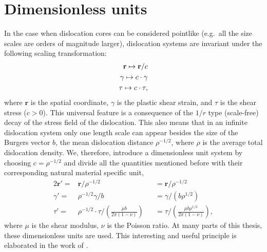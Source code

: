 \chapter{Dimensionless units}\label{sec:dimensionless_units}
In the case when dislocation cores can be considered pointlike (e.g.\ all the size scales are orders of magnitude larger), dislocation systems are invariant under the following scaling transformation:
\begin{align}
  {\mathbf{r}} \mapsto {\mathbf{r}}/c \hfill \\
  \gamma  \mapsto c \cdot \gamma  \hfill \\
  \tau  \mapsto c \cdot \tau,  \hfill \\ 
\end{align}
where $\mathbf{r}$ is the spatial coordinate, $\gamma$ is the plastic shear strain, and $\tau$ is the shear stress ($c>0$). This universal feature is a consequence of the $1/r$ type (scale-free) decay of the stress field of the dislocation. This also means that in an infinite dislocation system only one length scale can appear besides the size of the Burgers vector $b$, the mean dislocation distance $\rho^{-1/2}$, where $\rho$ is the average total dislocation density. We, therefore, introduce a dimensionless unit system by choosing $c=\rho^{-1/2}$ and divide all the quantities mentioned before with their corresponding natural material specific unit, 
\begin{alignat}{2}
  {\mathbf{r}}' =  & {\mathbf{r}}/{\rho ^{ - 1/2}} &&  = {\mathbf{r}}/{\rho ^{ - 1/2}} \\ 
  \gamma ' =  & {\rho ^{ - 1/2}}\gamma /b &&  = \gamma /\left( {b{\rho ^{1/2}}} \right) \\ 
  \tau ' =  & {\rho ^{ - 1/2}} \cdot \tau /\left( {\frac{{\mu b}}{{2\pi \left( {1 - \nu } \right)}}} \right) & & = \tau / \left( {\frac{{\mu b{\rho ^{1/2}}}}{{2\pi \left( {1 - \nu } \right)}}} \right), 
\end{alignat}
where $\mu$ is the shear modulus, $\nu$ is the Poisson ratio. At many parts of this thesis, these dimensionless units are used. This interesting and useful principle is elaborated in the work of \citet{0965-0393-22-6-065012}.